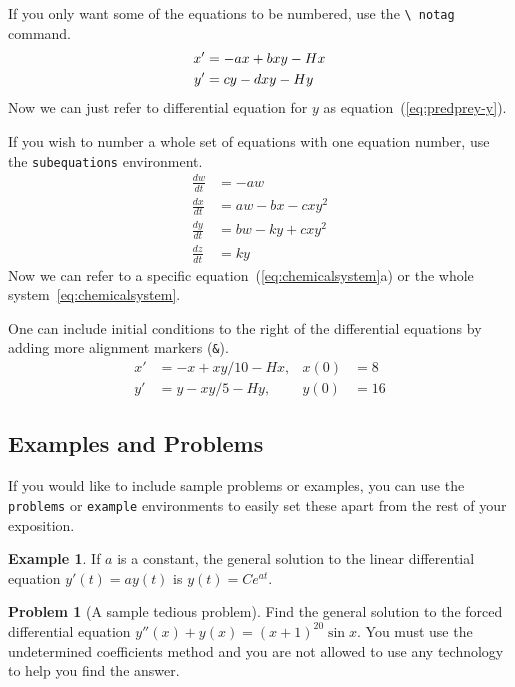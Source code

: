 \documentclass{codee}
\theoremstyle{definition}
\newtheorem{example}[theorem]{Example}
\newtheorem{problem}[theorem]{Problem}
\theoremstyle{remark}
\numberwithin{equation}{section}
\begin{document}
If you only want some of the equations to be numbered, use the \texttt{\textbackslash
  notag} command.
\begin{align}
    x' &= -ax + bxy - Hx \notag\\
    y' &= cy - dxy - Hy \label{eq:predprey-y}
\end{align}
Now we can just refer to differential equation for $y$ as
equation~(\ref{eq:predprey-y}).

If you wish to number a whole set of equations with one equation
number, use the \texttt{subequations} environment.
\begin{subequations}
\begin{align}
  \frac{dw}{dt} &= -aw \\
  \frac{dx}{dt} &= aw - bx - cxy^2 \\
  \frac{dy}{dt} &= bw - ky + cxy^2 \\
  \frac{dz}{dt} &= ky
\end{align} \label{eq:chemicalsystem}
\end{subequations}
Now we can refer to a specific equation~(\ref{eq:chemicalsystem}a) or the
whole system~\eqref{eq:chemicalsystem}.

One can include initial conditions to the right of the differential
equations by adding more alignment markers (\texttt{\&}).
\begin{align}
    x' &= -x + xy/10 - Hx, &x(0)&=8\\
    y' &= y - xy/5 -Hy,&y(0)&=16
\end{align}

\subsection{Examples and Problems}

If you would like to include sample problems or examples, you can use
the \texttt{problems} or \texttt{example} environments to easily set
these apart from the rest of your exposition.

\begin{example}
  If $a$ is a constant, the general solution to the linear
  differential equation $y'(t)=a y(t)$ is $y(t)=Ce^{at}$.
\end{example}

\begin{problem}[A sample tedious problem]\label{pr:tedious-problem}
Find the general solution to the forced differential equation $y''(x)+y(x) =
(x+1)^{20}\sin x$. You must use the undetermined coefficients
method and you are not allowed to use any technology to help
you find the answer.
\end{problem}
\end{document}
